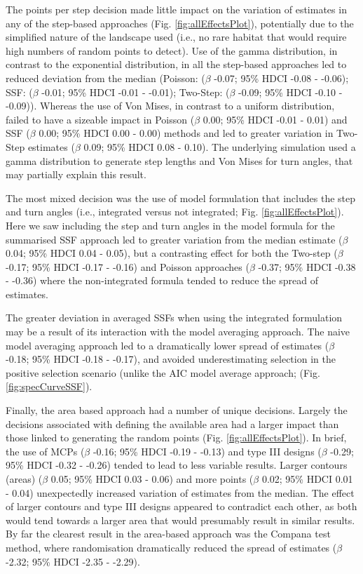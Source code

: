 \documentclass[10pt,a4paper]{article}
\begin{document}
The points per step decision made little impact on the variation of estimates in any of the step-based approaches (Fig. \ref{fig:allEffectsPlot}), potentially due to the simplified nature of the landscape used (i.e., no rare habitat that would require high numbers of random points to detect).
Use of the gamma distribution, in contrast to the exponential distribution, in all the step-based approaches led to reduced deviation from the median (Poisson: (\(\beta\) -0.07; 95\% HDCI -0.08 - -0.06); SSF: (\(\beta\) -0.01; 95\% HDCI -0.01 - -0.01); Two-Step: (\(\beta\) -0.09; 95\% HDCI -0.10 - -0.09)).
Whereas the use of Von Mises, in contrast to a uniform distribution, failed to have a sizeable impact in Poisson (\(\beta\) 0.00; 95\% HDCI -0.01 - 0.01) and SSF (\(\beta\) 0.00; 95\% HDCI 0.00 - 0.00) methods and led to greater variation in Two-Step estimates (\(\beta\) 0.09; 95\% HDCI 0.08 - 0.10).
The underlying simulation used a gamma distribution to generate step lengths and Von Mises for turn angles, that may partially explain this result.

The most mixed decision was the use of model formulation that includes the step and turn angles (i.e., integrated versus not integrated; Fig. \ref{fig:allEffectsPlot}).
Here we saw including the step and turn angles in the model formula for the summarised SSF approach led to greater variation from the median estimate (\(\beta\) 0.04; 95\% HDCI 0.04 - 0.05), but a contrasting effect for both the Two-step (\(\beta\) -0.17; 95\% HDCI -0.17 - -0.16) and Poisson approaches (\(\beta\) -0.37; 95\% HDCI -0.38 - -0.36) where the non-integrated formula tended to reduce the spread of estimates.

The greater deviation in averaged SSFs when using the integrated formulation may be a result of its interaction with the model averaging approach.
The naive model averaging approach led to a dramatically lower spread of estimates (\(\beta\) -0.18; 95\% HDCI -0.18 - -0.17), and avoided underestimating selection in the positive selection scenario (unlike the AIC model average approach; (Fig. \ref{fig:specCurveSSF}).

Finally, the area based approach had a number of unique decisions.
Largely the decisions associated with defining the available area had a larger impact than those linked to generating the random points (Fig. \ref{fig:allEffectsPlot}).
In brief, the use of MCPs (\(\beta\) -0.16; 95\% HDCI -0.19 - -0.13) and type III designs (\(\beta\) -0.29; 95\% HDCI -0.32 - -0.26) tended to lead to less variable results.
Larger contours (areas) (\(\beta\) 0.05; 95\% HDCI 0.03 - 0.06) and more points (\(\beta\) 0.02; 95\% HDCI 0.01 - 0.04) unexpectedly increased variation of estimates from the median.
The effect of larger contours and type III designs appeared to contradict each other, as both would tend towards a larger area that would presumably result in similar results.
By far the clearest result in the area-based approach was the Compana test method, where randomisation dramatically reduced the spread of estimates (\(\beta\) -2.32; 95\% HDCI -2.35 - -2.29).
\end{document}
